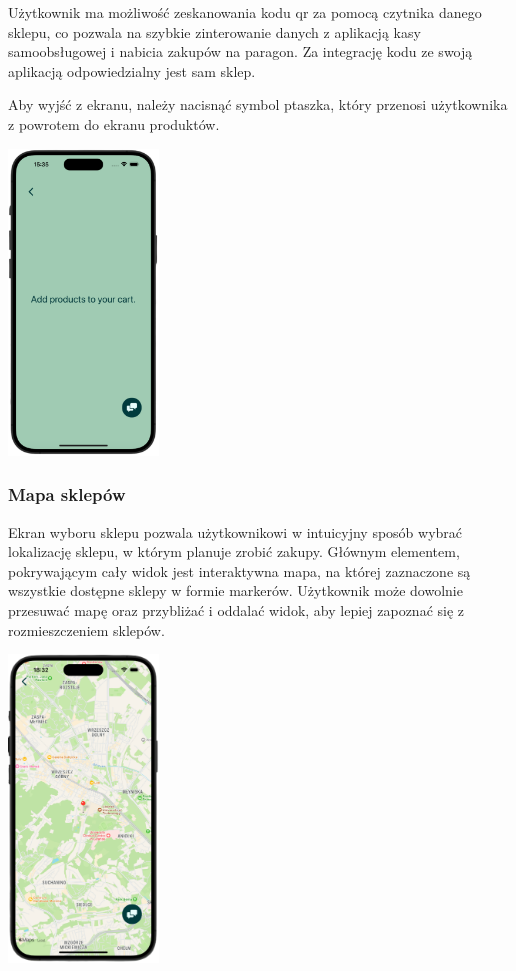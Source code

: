 Użytkownik ma możliwość zeskanowania kodu qr za pomocą czytnika danego sklepu, co pozwala na szybkie zinterowanie danych z aplikacją kasy samoobsługowej i nabicia zakupów na paragon. Za integrację kodu ze swoją aplikacją odpowiedzialny jest sam sklep. 

Aby wyjść z ekranu, należy nacisnąć symbol ptaszka, który przenosi użytkownika z powrotem do ekranu produktów.

\begin{center}
    \includegraphics[width=0.3\textwidth]{images/front/qr_empty.png}
\end{center}

\subsubsection{Mapa sklepów}

Ekran wyboru sklepu pozwala użytkownikowi w intuicyjny sposób wybrać lokalizację sklepu, w którym planuje zrobić zakupy. Głównym elementem, pokrywającym cały widok jest interaktywna mapa, na której zaznaczone są wszystkie dostępne sklepy w formie markerów. Użytkownik może dowolnie przesuwać mapę oraz przybliżać i oddalać widok, aby lepiej zapoznać się z rozmieszczeniem sklepów. 

\begin{center}
\includegraphics[width=0.3\textwidth]{images/front/store_page.png}
\end{center}

